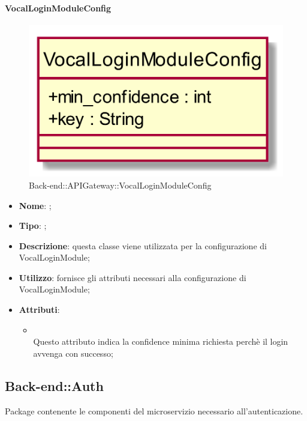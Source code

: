 \hypertarget{VocalLoginModuleConfig_label}{\paragraph{VocalLoginModuleConfig}}
\begin{figure}[h]
	\centering
	\includegraphics[width=\textwidth,height=\textheight,keepaspectratio]{images/ClassVocalLoginModuleConfig.png}
	\caption{Back-end::APIGateway::VocalLoginModuleConfig}
\end{figure}
\begin{itemize}
	\item \textbf{Nome}: ;
	\item \textbf{Tipo}: ;
	\item \textbf{Descrizione}: questa classe viene utilizzata per la configurazione di VocalLoginModule;
	\item \textbf{Utilizzo}: fornisce gli attributi necessari alla configurazione di VocalLoginModule;
	\item \textbf{Attributi}:
	\begin{itemize}
		\item[]  \\
		Questo attributo indica la confidence minima richiesta perchè il login avvenga con successo;
	\end{itemize}
\end{itemize}

\subsection{Back-end::Auth}
Package contenente le componenti del microservizio necessario all'autenticazione.
